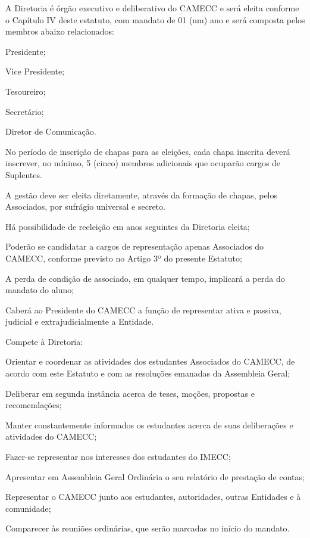 \documentclass{estatuto}
\begin{document}

\artigo A Diretoria é órgão executivo e deliberativo do CAMECC e será eleita conforme o Capítulo IV deste estatuto, com mandato de 01 (um) ano e será composta pelos membros abaixo relacionados:

\inciso Presidente;

\inciso Vice Presidente;

\inciso Tesoureiro;

\inciso Secretário;

\inciso Diretor de Comunicação.

\paragrafounico No período de inscrição de chapas para as eleições, cada chapa inscrita deverá inscrever, no mínimo, 5 (cinco) membros adicionais que ocuparão cargos de Suplentes.

\artigo A gestão deve ser eleita diretamente, através da formação de chapas, pelos Associados, por sufrágio universal e secreto.

\paragrafo Há possibilidade de reeleição em anos seguintes da Diretoria eleita;

\paragrafo Poderão se candidatar a cargos de representação apenas Associados do CAMECC, conforme previsto no Artigo 3º do presente Estatuto;

\paragrafo A perda de condição de associado, em qualquer tempo, implicará a perda do mandato do aluno;

\paragrafo Caberá ao Presidente do CAMECC a função de representar ativa e passiva, judicial e extrajudicialmente a Entidade.

\artigo Compete à Diretoria:

\inciso Orientar e coordenar as atividades dos estudantes Associados do CAMECC, de acordo com este Estatuto e com as resoluções emanadas da Assembleia Geral;

\inciso Deliberar em segunda instância acerca de teses, moções, propostas e recomendações;

\inciso Manter constantemente informados os estudantes acerca de suas deliberações e atividades do CAMECC;

\inciso Fazer-se representar nos interesses dos estudantes do IMECC;

\inciso Apresentar em Assembleia Geral Ordinária o seu relatório de prestação de contas;

\inciso Representar o CAMECC junto aos estudantes, autoridades, outras Entidades e à comunidade;

\inciso Comparecer às reuniões ordinárias, que serão marcadas no início do mandato.
\end{document}
